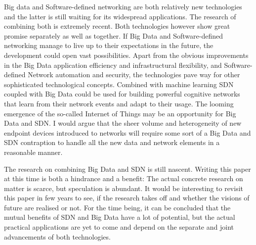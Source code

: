 \documentclass{acm_proc_article-sp}
\begin{document}
Big data and Software-defined networking are both relatively new technologies and the latter is still waiting for its widespread applications. The research of combining both is extremely recent. Both technologies however show great promise separately as well as together. If Big Data and Software-defined networking manage to live up to their expectations in the future, the development could open vast possibilities. Apart from the obvious improvements in the Big Data application efficiency and infrastructural flexibility, and Software-defined Network automation and security, the technologies pave way for other sophisticated technological concepts. Combined with machine learning SDN coupled with Big Data could be used for building powerful cognitive networks that learn from their network events and adapt to their usage. The looming emergence of the so-called Internet of Things may be an opportunity for Big Data and SDN. I would argue that the sheer volume and heterogeneity of new endpoint devices introduced to networks will require some sort of a Big Data and SDN contraption to handle all the new data and network elements in a reasonable manner.

The research on combining Big Data and SDN is still nascent. Writing this paper at this time is both a hindrance and a benefit: The actual concrete research on matter is scarce, but speculation is abundant. It would be interesting to revisit this paper in few years to see, if the research takes off and whether the visions of future are realised or not. For the time being, it can be concluded that the mutual benefits of SDN and Big Data have a lot of potential, but the actual practical applications are yet to come and depend on the separate and joint advancements of both technologies.



\end{document}
